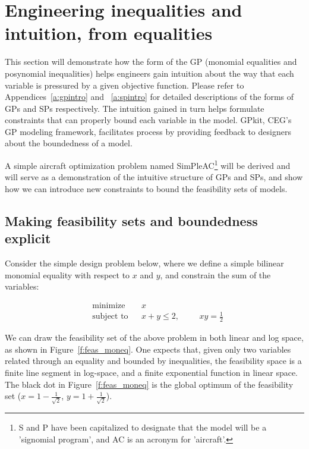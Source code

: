 \chapter{Engineering inequalities and intuition, from equalities}
\label{ch2:inequalities}

This section will demonstrate how the form of the \gls{GP} (monomial
equalities and posynomial inequalities) helps engineers gain intuition
about the way that each variable is pressured
by a given objective function. Please refer to Appendices~\ref{a:gpintro} and ~\ref{a:spintro}
for detailed descriptions of the forms of \gls{GP}s and \gls{SP}s respectively.
The intuition gained in turn helps formulate
constraints that can properly bound each variable in the model.
GPkit, \gls{CEG}'s \gls{GP} modeling framework,
facilitates process by providing feedback to designers about
the boundedness of a model.

A simple aircraft optimization problem named SimPleAC\footnote{S and P have been capitalized to designate that
the model will be a 'signomial program', and AC is an acronym for 'aircraft'.} will be derived and will serve as
a demonstration of the intuitive structure of \gls{GP}s and \gls{SP}s, and show
how we can introduce new constraints to bound the feasibility sets of models.

\section{Making feasibility sets and boundedness explicit}

Consider the simple design problem below, where we define a simple bilinear
monomial equality with respect to $x$ and $y$, and constrain the sum of the variables:

\begin{equation*}
\begin{aligned}
& {\text{minimize}}
& & x \\
& \text{subject to}
& & x + y \leq 2,
    & & & xy = \frac{1}{2} \label{simple_moneq}
\end{aligned}
\end{equation*}

We can draw the feasibility set of the above problem in both linear and log space,
as shown in Figure~\ref{f:feas_moneq}. One expects that, given only two variables
related through an equality and bounded by inequalities, the feasibility space is
a finite line segment in log-space, and a finite exponential function in linear space.
The black dot in Figure~\ref{f:feas_moneq} is the global optimum of the feasibility set
($x = 1 - \frac{1}{\sqrt{2}}$, $y = 1 + \frac{1}{\sqrt{2}}$).


